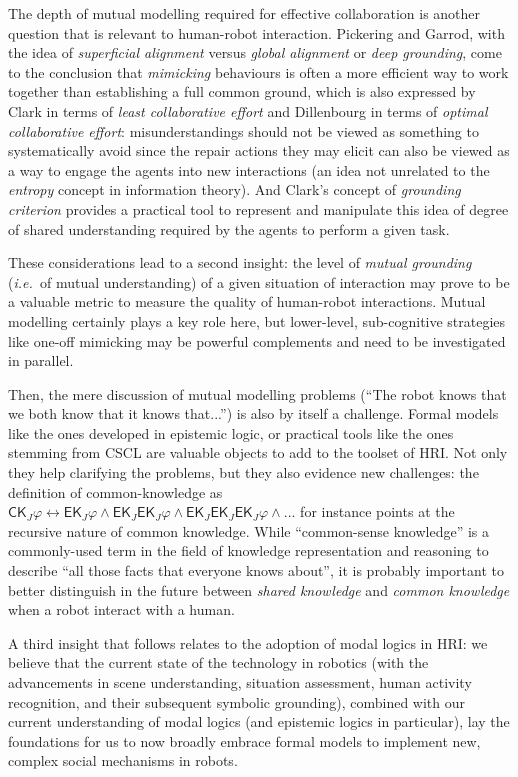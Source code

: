 \documentclass{sig-alternate}
\newcommand{\ie}{{\textit{i.e.~}}}
\begin{document}
The depth of mutual modelling required for effective collaboration is another
question that is relevant to human-robot interaction. Pickering and Garrod, with
the idea of \emph{superficial alignment} versus \emph{global alignment} or
\emph{deep grounding}, come to the conclusion that \emph{mimicking} behaviours
is often a more efficient way to work together than establishing a full common
ground, which is also expressed by Clark in terms of \emph{least collaborative
effort} and Dillenbourg in terms of \emph{optimal collaborative effort}:
misunderstandings should not be viewed as something to systematically avoid
since the repair actions they may elicit can also be viewed as a way to engage
the agents into new interactions (an idea not unrelated to the \emph{entropy}
concept in information theory). And Clark's concept of \emph{grounding
criterion} provides a practical tool to represent and manipulate this idea of
degree of shared understanding required by the agents to perform a given task.

These considerations lead to a second insight: the level of \emph{mutual
grounding} (\ie of mutual understanding) of a given situation of interaction may
prove to be a valuable metric to measure the quality of human-robot interactions.
Mutual modelling certainly plays a key role here, but lower-level, sub-cognitive
strategies like one-off mimicking may be powerful complements and need to be
investigated in parallel.

Then, the mere discussion of mutual modelling problems (``The robot knows
that we both know that it knows that...'') is also by itself a challenge. Formal
models like the ones developed in epistemic logic, or practical tools like the
ones stemming from CSCL are valuable objects to add to the toolset of HRI. Not
only they help clarifying the problems, but they also evidence new challenges:
the definition of common-knowledge as $\mathsf{CK}_J\varphi \leftrightarrow
\mathsf{EK}_J\varphi \wedge \mathsf{EK}_J\mathsf{EK}_J\varphi \wedge
\mathsf{EK}_J\mathsf{EK}_J\mathsf{EK}_J\varphi \wedge ...$ for instance points
at the recursive nature of common knowledge. While ``common-sense knowledge'' is
a commonly-used term in the field of knowledge representation and reasoning to
describe ``all those facts that everyone knows about'', it is probably important
to better distinguish in the future between \emph{shared knowledge} and
\emph{common knowledge} when a robot interact with a human.

A third insight that follows relates to the adoption of modal logics in HRI: we
believe that the current state of the technology in robotics (with the 
advancements in scene understanding, situation assessment, human activity
recognition, and their subsequent symbolic grounding), combined with our current
understanding of modal logics (and epistemic logics in particular), lay the
foundations for us to now broadly embrace formal models to implement new, complex
social mechanisms in robots.
\end{document}
